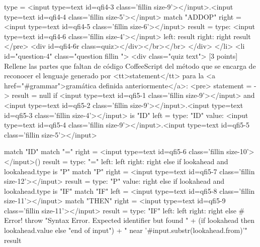 \begin{rawhtml}
{      type = <input type=text id=qfi4-3 class='fillin size-9'></input>.<input type=text id=qfi4-4 class='fillin size-5'></input>
      match "ADDOP"
      right = <input type=text id=qfi4-5 class='fillin size-6'></input>
      result =
        type: <input type=text id=qfi4-6 class='fillin size-4'></input>
        left: result
        right: right
    result
</pre>
<div id=qfi4-6r class=quiz></div></br></br>      </div>
    </li>
    <li id="question-4" class="question fillin ">
      <div class="quiz text">
[3 points] 
Rellene las partes que faltan de código CoffeeScript del 
método que se encarga de reconocer el lenguaje generado
por <tt>statement</tt> para la <a href="#grammar">gramática
definida anteriormente</a>:
<pre>
  statement = ->
    result = null
    if <input type=text id=qfi5-1 class='fillin size-9'></input> and <input type=text id=qfi5-2 class='fillin size-9'></input>.<input type=text id=qfi5-3 class='fillin size-4'></input> is "ID"
      left =
        type: "ID"
        value: <input type=text id=qfi5-4 class='fillin size-9'></input>.<input type=text id=qfi5-5 class='fillin size-5'></input>

      match "ID"
      match "="
      right = <input type=text id=qfi5-6 class='fillin size-10'></input>()
      result =
        type: "="
        left: left
        right: right
    else if lookahead and lookahead.type is "P"
      match "P"
      right = <input type=text id=qfi5-7 class='fillin size-12'></input>
      result =
        type: "P"
        value: right
    else if lookahead and lookahead.type is "IF"
      match "IF"
      left = <input type=text id=qfi5-8 class='fillin size-11'></input>
      match "THEN"
      right = <input type=text id=qfi5-9 class='fillin size-11'></input>
      result =
        type: "IF"
        left: left
        right: right
    else # Error!
      throw "Syntax Error. Expected identifier but found " + 
        (if lookahead then lookahead.value else "end of input") + 
        " near '#{input.substr(lookahead.from)}'"
    result

}
\end{rawhtml}
